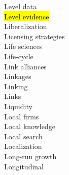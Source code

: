 \documentclass[a4paper]{article}
\begin{document}
\begin{multicols*}{2}
\begin{footnotesize}
{Level data} \\ \hl{Level evidence} \\ Liberalization \\ Licensing strategies \\ Life sciences \\ Life-cycle \\ Link alliances \\ Linkages \\ Linking \\ Links \\ Liquidity \\ Local firms \\ Local knowledge \\ Local search \\ Localization \\ Long-run growth \\ Longitudinal 
\end{footnotesize}
\end{multicols*}
\end{document}
